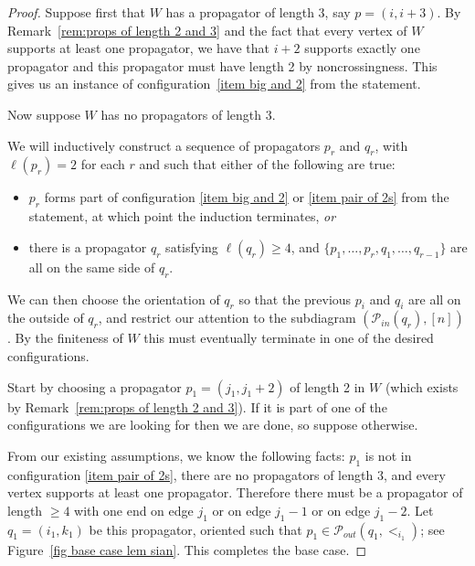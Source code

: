 \documentclass[11pt]{article}
\newcommand{\cP}{\mathcal{P}}
\theoremstyle{remark}
\theoremstyle{definition}
\begin{document}
\begin{proof}
Suppose first that $W$ has a propagator of length $3$, say $p=(i, i+3)$.  By Remark~\ref{rem:props of length 2 and 3} and the fact that every vertex of $W$ supports at least one propagator, we have that $i+2$ supports exactly one propagator and this propagator must have length 2 by noncrossingness.  This gives us an instance of configuration~\ref{item big and 2} from the statement.

Now suppose $W$ has no propagators of length $3$.
  
We will inductively construct a sequence of propagators $p_r$ and $q_r$, with $\ell(p_r) = 2$ for each $r$ and such that either of the following are true:
\begin{itemize}
\item $p_r$ forms part of configuration \ref{item big and 2} or \ref{item pair of 2s} from the statement, at which point the induction terminates, 
{\em or} 
\item there is a propagator $q_r$ satisfying $\ell(q_r) \geq 4$, and $\{p_1, \ldots, p_r, q_1, \ldots, q_{r-1}\}$ are all on the same side of $q_r$.  
\end{itemize}

We can then choose the orientation of $q_r$ so that the previous $p_i$ and $q_i$ are all on the outside of $q_r$, and restrict our attention to the subdiagram $(\cP_{in}(q_r),[n])$. By the finiteness of $W$ this must eventually terminate in one of the desired configurations. %


Start by choosing a propagator $p_1 = (j_1,j_1+2)$ of length 2 in $W$ (which exists by Remark~\ref{rem:props of length 2 and 3}).  If it is part of one of the configurations we are looking for then we are done, 
so suppose otherwise. 

From our existing assumptions, we know the following facts: $p_1$ is not in configuration \ref{item pair of 2s}, there are no propagators of length $3$, and every vertex supports at least one propagator.  Therefore there must be a propagator of length $\geq 4$ with one end on edge $j_1$ or on edge $j_1-1$ or on edge $j_1-2$.  Let $q_1 = (i_1, k_1)$ be this propagator, oriented such that $p_1 \in \cP_{out}(q_1,<_{i_1})$; see Figure~\ref{fig base case lem sian}. This completes the base case.


\end{proof}
\end{document}
